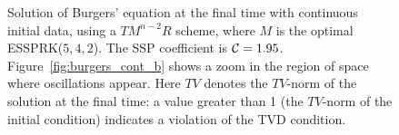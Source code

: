 \begin{figure}
    \centering
    \caption{Solution of Burgers' equation at the final time with continuous initial data, using a
    $TM^{n-2}R$ scheme, where $M$ is the optimal ESSPRK($5,4,2$). 
    The SSP coefficient is $\mathcal{C} = 1.95$. 
    Figure~\ref{fig:burgers_cont_b} shows a zoom in the region of space where
    oscillations appear.
    Here $TV$ denotes the $TV$-norm of the solution at the final time:
    a value greater than 1 (the $TV$-norm of the initial condition)
    indicates a violation of the TVD condition.
    }
    \label{fig:burgers_cont}
\end{figure}

